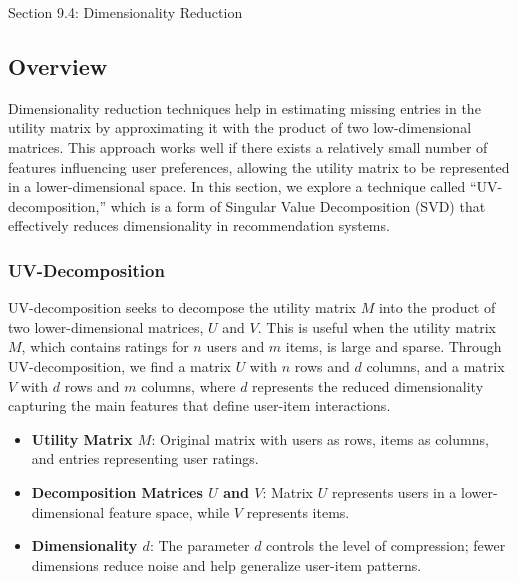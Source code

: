 \begin{notes}{Section 9.4: Dimensionality Reduction}
    \subsection*{Overview}

    Dimensionality reduction techniques help in estimating missing entries in the utility matrix by approximating it with the product of two low-dimensional matrices. This approach works well if there exists 
    a relatively small number of features influencing user preferences, allowing the utility matrix to be represented in a lower-dimensional space. In this section, we explore a technique called 
    “UV-decomposition,” which is a form of Singular Value Decomposition (SVD) that effectively reduces dimensionality in recommendation systems.
    
    \subsubsection*{UV-Decomposition}
    
    UV-decomposition seeks to decompose the utility matrix $M$ into the product of two lower-dimensional matrices, $U$ and $V$. This is useful when the utility matrix $M$, which contains ratings 
    for $n$ users and $m$ items, is large and sparse. Through UV-decomposition, we find a matrix $U$ with $n$ rows and $d$ columns, and a matrix $V$ with $d$ rows and $m$ columns, 
    where $d$ represents the reduced dimensionality capturing the main features that define user-item interactions.
    
    \begin{highlight}
        \begin{itemize}
            \item \textbf{Utility Matrix $M$}: Original matrix with users as rows, items as columns, and entries representing user ratings.
            \item \textbf{Decomposition Matrices $U$ and $V$}: Matrix $U$ represents users in a lower-dimensional feature space, while $V$ represents items.
            \item \textbf{Dimensionality $d$}: The parameter $d$ controls the level of compression; fewer dimensions reduce noise and help generalize user-item patterns.
        \end{itemize}
    \end{highlight}
    

\end{notes}
